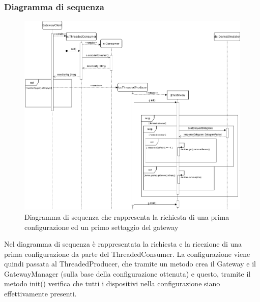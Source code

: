 	\begin{landscape}
		\subsubsection{Diagramma di sequenza}%
		  	\begin{figure}[H]
				\centering
				\includegraphics[scale=0.400]{res/images/GATEWAY/RichiestaInvioGateway.png}
				\caption{Diagramma di sequenza che rappresenta la richiesta di una prima configurazione ed un primo settaggio del gateway}
				\label{Diagramma 3}
			\end{figure}
			Nel diagramma di sequenza è rappresentata la richiesta e la ricezione di una prima configurazione da parte del ThreadedConsumer.
			\newline
			La configurazione viene quindi passata al ThreadedProducer, che tramite un metodo crea il Gateway e il GatewayManager (sulla base della configurazione ottenuta) e questo, tramite il metodo init() verifica che tutti i dispositivi nella configurazione siano effettivamente presenti.
	\end{landscape}
	
